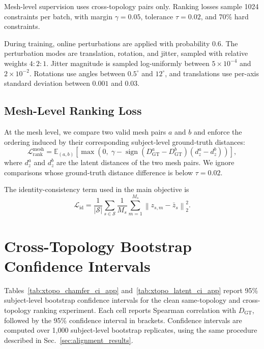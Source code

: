\documentclass{article}
\begin{document}
Mesh-level supervision uses cross-topology pairs only. Ranking losses sample
1024 constraints per batch, with margin $\gamma=0.05$, tolerance $\tau=0.02$,
and 70\% hard constraints.

During training, online perturbations are applied with probability 0.6. The
perturbation modes are translation, rotation, and jitter, sampled with relative
weights $4{:}2{:}1$. Jitter magnitude is sampled log-uniformly between
$5\times10^{-4}$ and $2\times10^{-2}$. Rotations use angles between
$0.5^\circ$ and $12^\circ$, and translations use per-axis standard deviation
between $0.001$ and $0.03$.
\subsection{Mesh-Level Ranking Loss}
\label{app:mesh_level_ranking_loss}

At the mesh level, we compare two valid mesh pairs $a$ and $b$ and enforce the
ordering induced by their corresponding subject-level ground-truth distances:
\begin{equation}
\mathcal L^{\mathrm{mesh}}_{\mathrm{rank}}
=
\mathbb E_{(a,b)}
\left[
\max
\left(
0,\;
\gamma -
\operatorname{sign}
\left(
D_{\mathrm{GT}}^a-D_{\mathrm{GT}}^b
\right)
\left(
d_z^a-d_z^b
\right)
\right)
\right],
\end{equation}
where $d_z^a$ and $d_z^b$ are the latent distances of the two mesh pairs. We
ignore comparisons whose ground-truth distance difference is below $\tau=0.02$.

The identity-consistency term used in the main objective is
\begin{equation}
\mathcal L_{\mathrm{id}}
=
\frac{1}{|\mathcal S|}
\sum_{s\in\mathcal S}
\frac{1}{M_s}
\sum_{m=1}^{M_s}
\left\|
z_{s,m}-\bar z_s
\right\|_2^2 .
\end{equation}

\section{Cross-Topology Bootstrap Confidence Intervals}
\label{app:xtopo_bootstrap_ci}

Tables~\ref{tab:xtopo_chamfer_ci_app} and~\ref{tab:xtopo_latent_ci_app}
report 95\% subject-level bootstrap confidence intervals for the clean
same-topology and cross-topology ranking experiment. Each cell reports Spearman
correlation with $D_{\mathrm{GT}}$, followed by the 95\% confidence interval in
brackets. Confidence intervals are computed over 1,000 subject-level bootstrap
replicates, using the same procedure described in Sec.~\ref{sec:alignment_results}.
\end{document}
